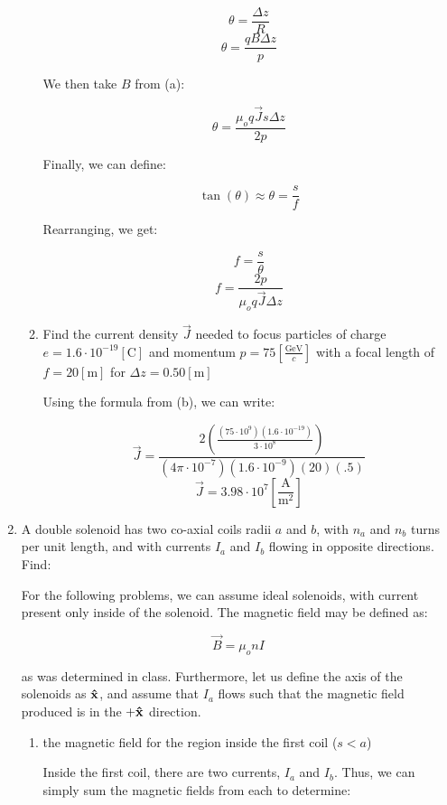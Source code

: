 \begin{enumerate}
\begin{enumerate}
        $$\theta=\frac{\Delta z}{R}$$
        $$\theta=\frac{qB\Delta z}{p}$$

        We then take $B$ from (a):

        $$\theta=\frac{\mu_oq\vec{J}s\Delta z}{2p}$$

        Finally, we can define:

        $$\tan(\theta)\approx \theta=\frac{s}{f}$$

        Rearranging, we get:

        $$f=\frac{s}{\theta}$$
        $$\boxed{f=\frac{2p}{\mu_oq\vec{J}\Delta z}}$$

      \item Find the current density $\vec{J}$ needed to focus particles of charge $e=1.6\cdot10^{−19}[\si{\coulomb}]$ and momentum $p=75\left[ \frac{\si{\giga\eV}}{c} \right]$ with a focal length of $f=20 [\si{\meter}]$ for $\Delta z=0.50[\si{\meter}]$

        Using the formula from (b), we can write:

        $$\vec{J}=\frac{2\left( \frac{(75\cdot10^9)(1.6\cdot10^{-19})}{3\cdot10^8} \right)}{(4\pi\cdot10^{-7})(1.6\cdot10^{-9})(20)(.5)}$$
        $$\boxed{\vec{J}=3.98\cdot10^7\left[ \frac{\si{\ampere}}{\si{\meter\squared}} \right]}$$

    \end{enumerate}

  \item A double solenoid has two co-axial coils radii $a$ and $b$, with $n_a$ and $n_b$ turns per unit length, and with currents $I_a$ and $I_b$ flowing in opposite directions. Find:

    For the following problems, we can assume ideal solenoids, with current present only inside of the solenoid. The magnetic field may be defined as:

    $$\vec{B}=\mu_onI$$

    as was determined in class. Furthermore, let us define the axis of the solenoids as $\bold{\hat{x}}$, and assume that $I_a$ flows such that the magnetic field produced is in the $+\bold{\hat{x}}$ direction.

    \begin{enumerate}

      \item the magnetic field for the region inside the first coil ($s<a$)

        Inside the first coil, there are two currents, $I_a$ and $I_b$. Thus, we can simply sum the magnetic fields from each to determine:


\end{enumerate}
\end{enumerate}
